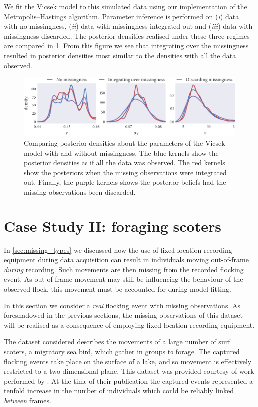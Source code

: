We fit the Vicsek model to this simulated data using our implementation of the
Metropolis--Hastings algorithm. Parameter inference is performed on (\emph{i})
data with no missingness, (\emph{ii}) data with missingness integrated out and
(\emph{iii}) data with missingness discarded. The posterior densities realised
under these three regimes are compared in \cref{fig:both_compare}. From this
figure we see that integrating over the missingness resulted in posterior
densities most similar to the densities with all the data observed.

\begin{figure}[tbp]
  \includegraphics{both/compare_params.pdf}
  \caption{Comparing posterior densities about the parameters of the Vicsek
  model with and without missingness. The blue kernels show the posterior
  densities as if all the data was observed. The red kernels show the
  posteriors when the missing observations were integrated out. Finally, the
  purple kernels shows the posterior beliefs had the missing observations been
  discarded.}
  \label{fig:both_compare}
\end{figure}


\section{Case Study II: foraging scoters}
\label{sec:scoters}

In \cref{sec:missing_types} we discussed how the use of fixed-location recording
equipment during data acquisition can result in individuals moving out-of-frame
\emph{during} recording. Such movements are then missing from the recorded
flocking event. As out-of-frame movement may still be influencing the behaviour
of the observed flock, this movement must be accounted for during model
fitting.

In this section we consider a \emph{real} flocking event with missing
observations. As foreshadowed in the previous sections, the missing
observations of this dataset will be realised as a consequence of employing
fixed-location recording equipment.

The dataset considered  describes the movements of a large number of surf
scoters, a migratory sea bird, which gather in groups to forage. The captured
flocking events take place on the surface of a lake, and so movement is
effectively restricted to a two-dimensional plane. This dataset was provided
courtesy of work performed by \textcite{lukeman09,lukeman10}. At the time of
their publication the captured events represented a tenfold increase in the
number of individuals which could be reliably linked \emph{between} frames.

